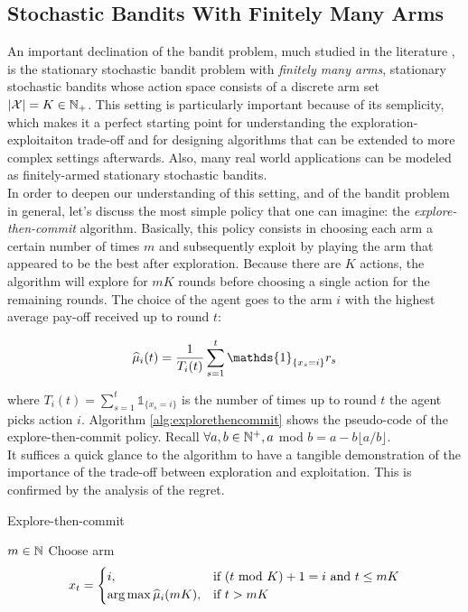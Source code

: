 \subsection{Stochastic Bandits With Finitely Many Arms} \label{finiteMABs}
An important declination of the bandit problem, much studied in the literature \cite{lattimore2019bandit}, is the stationary stochastic bandit problem with \emph{finitely many arms}, \ie stationary stochastic bandits whose action space consists of a discrete arm set $|\mathcal{X}| = K \in \mathbb{N}_{+}$. This setting is particularly important because of its semplicity, which makes it a perfect starting point for understanding the exploration-exploitaiton trade-off and for designing algorithms that can be extended to more complex settings afterwards. Also, many real world applications can be modeled as finitely-armed stationary stochastic bandits. \\ In order to deepen our understanding of this setting, and of the bandit problem in general, let's discuss the most simple policy that one can imagine: the \emph{explore-then-commit} algorithm. Basically, this policy consists in choosing each arm a certain number of times $m$ and subsequently exploit by playing the arm that appeared to be the best after exploration. Because there are $K$ actions, the algorithm will explore for $mK$ rounds before choosing a single action for the remaining rounds. The choice of the agent goes to the arm $i$ with the highest average pay-off received up to round $t$:

\begin{equation}
\wh{\mu}_i(t) = \frac{1}{T_i(t)}\sum_{s=1}^{t}\mathds{1}_{\{x_s=i\}}r_s \label{eq:averagereward}
\end{equation}

where $T_i(t)= \sum_{s=1}^{t}\mathds{1}_{\{x_s=i\}}$ is the number of times up to round $t$ the agent picks action $i$. Algorithm \ref{alg:explorethencommit} shows the pseudo-code of the explore-then-commit policy. Recall $\forall a,b\in\mathbb{N}^{+},a$ mod $b = a-b\lfloor a/b\rfloor$. \\ It suffices a quick glance to the algorithm to have a tangible demonstration of the importance of the trade-off between exploration and exploitation. This is confirmed by the analysis of the regret.

\begin{algorithm}[t]
	\caption{Explore-then-commit}
	\label{alg:explorethencommit}
	\begin{algorithmic}[1]
	 $m\in\mathbb{N}$
		\State Choose arm \begin{equation*} x_t = \begin{cases}i, &\text{if $(t$ mod $K)+1=i$ and $t\leq mK$} \\ \arg\max\widehat{\mu}_i(mK), &\text{if } t>mK\end{cases} \end{equation*}
	\EndFor
	\end{algorithmic}
\end{algorithm}

